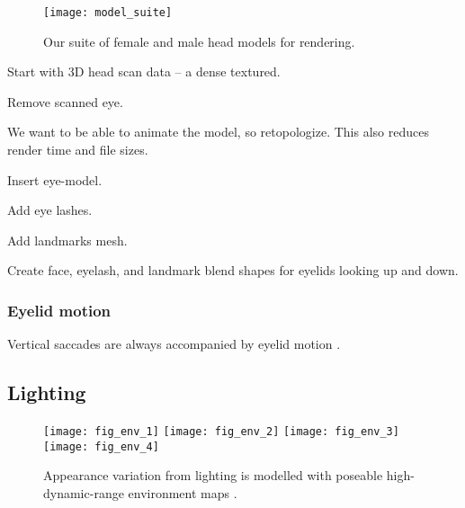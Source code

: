 \begin{figure*}
    \texttt{[image: model\_suite]}
    \caption{Our suite of female and male head models for rendering.}
    \label{fig:model_suite}
\end{figure*}

Start with 3D head scan data -- a dense textured.

Remove scanned eye.

We want to be able to animate the model, so retopologize. This also reduces render time and file sizes.

Insert eye-model.

Add eye lashes.

Add landmarks mesh.

Create face, eyelash, and landmark blend shapes for eyelids looking up and down.

\subsubsection{Eyelid motion}

Vertical saccades are always accompanied by eyelid motion \cite{liversedge2011oxford}.

\subsection{Lighting}

\begin{figure}
    \texttt{[image: fig\_env\_1]} \hfill
    \texttt{[image: fig\_env\_2]} \hfill
    \texttt{[image: fig\_env\_3]} \hfill
    \texttt{[image: fig\_env\_4]}
    \caption{Appearance variation from lighting is modelled with poseable high-dynamic-range environment maps \cite{debevec2002image}.}
    \label{fig:participants}
\end{figure}
